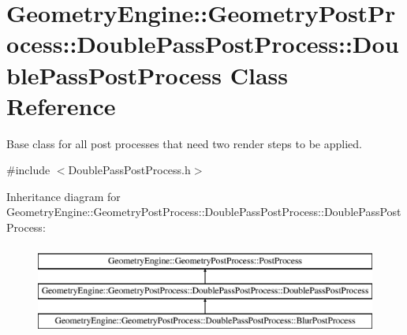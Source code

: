 \hypertarget{class_geometry_engine_1_1_geometry_post_process_1_1_double_pass_post_process_1_1_double_pass_post_process}{}\section{Geometry\+Engine\+::Geometry\+Post\+Process\+::Double\+Pass\+Post\+Process\+::Double\+Pass\+Post\+Process Class Reference}
\label{class_geometry_engine_1_1_geometry_post_process_1_1_double_pass_post_process_1_1_double_pass_post_process}


Base class for all post processes that need two render steps to be applied.  




{\ttfamily \#include $<$Double\+Pass\+Post\+Process.\+h$>$}

Inheritance diagram for Geometry\+Engine\+::Geometry\+Post\+Process\+::Double\+Pass\+Post\+Process\+::Double\+Pass\+Post\+Process\+:\begin{figure}[H]
\begin{center}
\leavevmode
\includegraphics[height=3.000000cm]{class_geometry_engine_1_1_geometry_post_process_1_1_double_pass_post_process_1_1_double_pass_post_process}
\end{center}
\end{figure}

